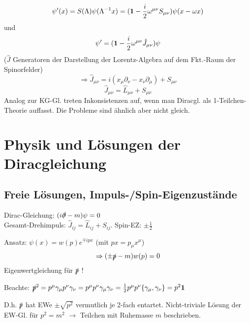 \documentclass[11pt,a4paper]{report}
\begin{document}
$$\psi '(x)=S(\Lambda )\psi (\Lambda^{-1}x) = (\mathbf{1}-\frac{i}{2}\omega^{\mu\nu}S_{\mu\nu})\psi (x-\omega x)$$
und
$$\psi '=(\mathbf{1}-\frac{i}{2}\omega^{\mu\nu}\hat{J}_{\mu\nu})\psi$$
($\hat{J}$ Generatoren der Darstellung der Lorentz-Algebra auf dem Fkt.-Raum der Spinorfelder)
$$\Longrightarrow \hat{J}_{\mu\nu}=i(x_\mu\partial_\nu -x_\nu\partial_\mu )+S_{\mu\nu}$$
$$\hat{J}_{\mu\nu}=\hat{L}_{\mu\nu}+S_{\mu\nu}$$
Analog zur KG-Gl. treten Inkonsistenzen auf, wenn man Diracgl. als 1-Teilchen-Theorie auffasst. Die Probleme sind ähnlich aber nicht gleich.

\section{Physik und Lösungen der Diracgleichung}

\subsection{Freie Lösungen, Impuls-/Spin-Eigenzustände}

\newcommand{\dslash}{\slashed{\partial}}
\newcommand{\pslash}{\slashed{p}}

Dirac-Gleichung: $(i\dslash - m)\psi = 0$\\
Gesamt-Drehimpuls: $\hat{J}_{ij}=\hat{L}_{ij}+S_{ij}$. Spin-EZ: $\pm\frac{1}{2}$\par 

Ansatz: $\psi (x)= w(p)e^{\mp ipx}$ (mit $px = p_\mu x^\mu$)
$$\Rightarrow (\pm \pslash - m)w(p)=0$$
Eigenwertgleichung für $\pslash$ !\par 

Beachte: $\pslash^2 = p^\mu\gamma_\mu p^\nu\gamma_\nu = p^\mu p^\nu \gamma_\mu\gamma_\nu = \frac{1}{2}p^\mu p^\nu \{\gamma_\mu ,\gamma_\nu\} = p^2\vf{1}$\par 
D.h. $\pslash$ hat EWe $\pm \sqrt{p^2}$ vermutlich je 2-fach entartet. Nicht-triviale Lösung der EW-Gl. für $p^2=m^2$ $\rightarrow$ Teilchen mit Ruhemasse $m$ beschrieben.
\end{document}
